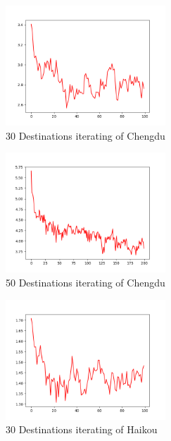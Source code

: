 \documentclass{llncs}
\begin{document}
\begin{figure}[htbp]
	\centering
	\begin{subfigure}[t]{0.45\textwidth}
		\begin{minipage}{6cm}
			\centering
			\includegraphics[width=6cm]{figures/cd_30.png}
			\caption{30 Destinations iterating of Chengdu}
		\end{minipage}%
	\end{subfigure}
	\begin{subfigure}[t]{0.45\textwidth}
		\begin{minipage}{6cm}
			\centering
			\includegraphics[width=6cm]{figures/cd_50.png}
			\caption{50 Destinations iterating of Chengdu}
		\end{minipage}
	\end{subfigure}
	\begin{subfigure}[t]{0.45\textwidth}
		\begin{minipage}{6cm}
			\centering
			\includegraphics[width=6cm]{figures/hk_30.png}
			\caption{30 Destinations iterating of Haikou}
		\end{minipage}%
	\end{subfigure}
	\begin{subfigure}[t]{0.45\textwidth}

\end{subfigure}
\end{figure}
\end{document}
